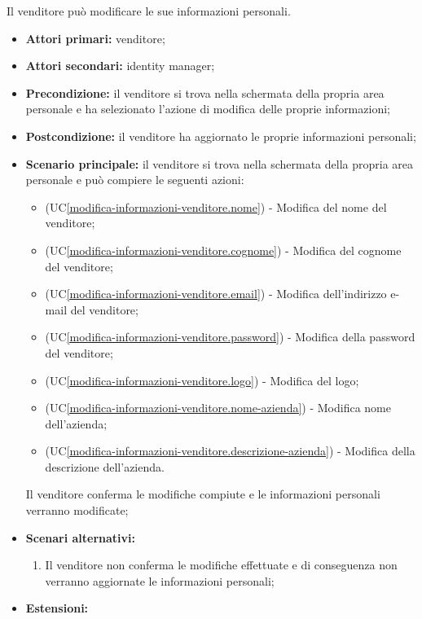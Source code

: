 \label{modifica-informazioni-venditore}

Il venditore può modificare le sue informazioni personali.
\begin{itemize}
    \item \textbf{Attori primari:} venditore;
    \item \textbf{Attori secondari:} identity manager;
    \item \textbf{Precondizione:} il venditore si trova nella schermata della propria area personale e ha selezionato l'azione di modifica delle proprie informazioni;
    \item \textbf{Postcondizione:} il venditore ha aggiornato le proprie informazioni personali;
    \item \textbf{Scenario principale:} il venditore si trova nella schermata della propria area personale e può compiere le seguenti azioni:
    \begin{itemize}
    	\item (UC\ref{modifica-informazioni-venditore.nome}) - Modifica del nome del venditore;
    	\item (UC\ref{modifica-informazioni-venditore.cognome}) - Modifica del cognome del venditore;
        \item (UC\ref{modifica-informazioni-venditore.email}) - Modifica dell'indirizzo e-mail del venditore;
        \item (UC\ref{modifica-informazioni-venditore.password}) - Modifica della password del venditore;
        \item (UC\ref{modifica-informazioni-venditore.logo}) - Modifica del logo;
        \item (UC\ref{modifica-informazioni-venditore.nome-azienda}) - Modifica nome dell'azienda;
        \item (UC\ref{modifica-informazioni-venditore.descrizione-azienda}) - Modifica della descrizione dell'azienda.
    \end{itemize}
    Il venditore conferma le modifiche compiute e le informazioni personali verranno modificate;
    \item \textbf{Scenari alternativi:}
    \begin{enumerate}[label=\lett]
    	\item Il venditore non conferma le modifiche effettuate e di conseguenza non verranno aggiornate le informazioni personali;
    \end{enumerate}
    \item \textbf{Estensioni:}
    \begin{enumerate}[label=\lett]

\end{enumerate}
\end{itemize}
